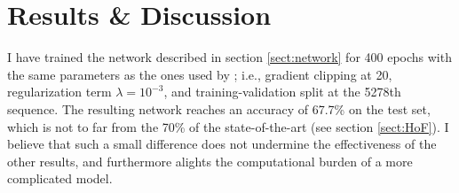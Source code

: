 \chapter{Results \& Discussion} \label{Chapter: Results}







I have trained the network described in section \ref{sect:network} for 400 epochs with the same parameters as the ones used by \cite{Jurtz2017}; i.e., gradient clipping at 20, regularization term $\lambda=10^{-3}$, and training-validation split at the 5278th sequence. The resulting network reaches an accuracy of 67.7\% on the test set, which is not to far from the 70\% of the state-of-the-art (see section \ref{sect:HoF}). I believe that such a small difference does not undermine the effectiveness of the other results, and furthermore alights the computational burden of a more complicated model.

